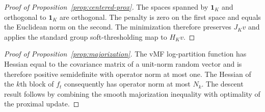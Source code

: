 \documentclass[preprint,12pt,authoryear]{elsarticle}
\begin{document}
\begin{proof}[Proof of Proposition~\ref{prop:centered-prox}]
The spaces spanned by $\mathbf1_K$ and orthogonal to $\mathbf1_K$ are
orthogonal. The penalty is zero on the first space and equals the Euclidean
norm on the second. The minimization therefore preserves $J_Kv$ and applies
the standard group soft-thresholding map to $H_Kv$.
\end{proof}

\begin{proof}[Proof of Proposition~\ref{prop:majorization}]
The vMF log-partition function has Hessian equal to the covariance matrix of a
unit-norm random vector and is therefore positive semidefinite with operator
norm at most one. The Hessian of the $k$th block of $f_t$ consequently has
operator norm at most $N_k$. The descent result follows by combining the
smooth majorization inequality with optimality of the proximal update.
\end{proof}
\end{document}
